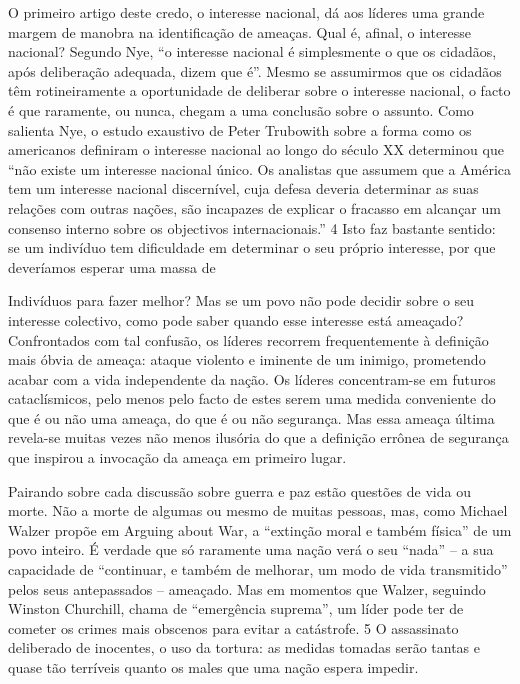 O primeiro artigo deste credo, o interesse nacional, dá aos líderes uma grande margem de manobra na identificação de ameaças. Qual é, afinal, o interesse nacional? Segundo Nye, “o interesse nacional é simplesmente o que os cidadãos, após deliberação adequada, dizem que é”. Mesmo se assumirmos que os cidadãos têm rotineiramente a oportunidade de deliberar sobre o interesse nacional, o facto é que raramente, ou nunca, chegam a uma conclusão sobre o assunto. Como salienta Nye, o estudo exaustivo de Peter Trubowith sobre a forma como os americanos definiram o interesse nacional ao longo do século XX determinou que “não existe um interesse nacional único. Os analistas que assumem que a América tem um interesse nacional discernível, cuja defesa deveria determinar as suas relações com outras nações, são incapazes de explicar o fracasso em alcançar um consenso interno sobre os objectivos internacionais.” {\color{blue}4} Isto faz bastante sentido: se um indivíduo tem dificuldade em determinar o seu próprio interesse, por que deveríamos esperar uma massa de
 \par 
Indivíduos para fazer melhor? Mas se um povo não pode decidir sobre o seu interesse colectivo, como pode saber quando esse interesse está ameaçado? Confrontados com tal confusão, os líderes recorrem frequentemente à definição mais óbvia de ameaça: ataque violento e iminente de um inimigo, prometendo acabar com a vida independente da nação. Os líderes concentram-se em futuros cataclísmicos, pelo menos pelo facto de estes serem uma medida conveniente do que é ou não uma ameaça, do que é ou não segurança. Mas essa ameaça última revela-se muitas vezes não menos ilusória do que a definição errônea de segurança que inspirou a invocação da ameaça em primeiro lugar.
 \par 
Pairando sobre cada discussão sobre guerra e paz estão questões de vida ou morte. Não a morte de algumas ou mesmo de muitas pessoas, mas, como Michael Walzer propõe em Arguing about War, a “extinção moral e também física” de um povo inteiro. É verdade que só raramente uma nação verá o seu “nada” – a sua capacidade de “continuar, e também de melhorar, um modo de vida transmitido” pelos seus antepassados ​​– ameaçado. Mas em momentos que Walzer, seguindo Winston Churchill, chama de “emergência suprema”, um líder pode ter de cometer os crimes mais obscenos para evitar a catástrofe. {\color{blue}5} O assassinato deliberado de inocentes, o uso da tortura: as medidas tomadas serão tantas e quase tão terríveis quanto os males que uma nação espera impedir.
 \par 
